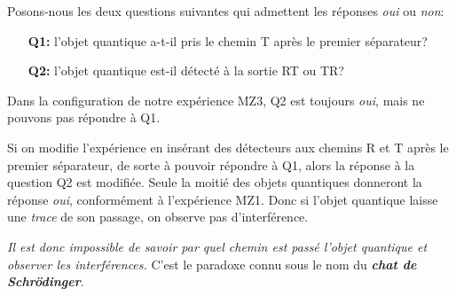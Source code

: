 Posons-nous les deux questions suivantes qui admettent les réponses \emph{oui}
ou \emph{non}:

\begin{enumerate}
\item[\textbf{Q1:}] l'objet quantique a-t-il pris le chemin T après le premier
séparateur?

\item[\textbf{Q2:}] l'objet quantique est-il détecté à la sortie RT ou TR?
\end{enumerate}

Dans la configuration de notre expérience MZ3, Q2 est toujours \emph{oui},
mais ne pouvons pas répondre à Q1.

Si on modifie l'expérience en insérant des détecteurs aux chemins R et T après
le premier séparateur, de sorte à pouvoir répondre à Q1, alors la réponse à la
question Q2 est modifiée. Seule la moitié des objets quantiques donneront la
réponse \emph{oui}, conformément à l'expérience MZ1. Donc si l'objet quantique
laisse une \emph{trace} de son passage, on observe pas d'interférence.

\medskip
\colorbox[gray]{0.8}{
\parbox[c]{0.9\textwidth}{
\emph{Il est donc impossible de savoir par quel chemin est passé l'objet
quantique et observer les interférences.} C'est le paradoxe connu sous le nom
du \emph{\textbf{chat de Schrödinger}}.
}}

